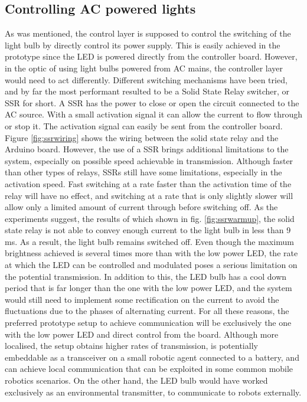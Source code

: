\subsection{Controlling AC powered lights}
As was mentioned, the control layer is supposed to control the switching of the light bulb by directly control its power supply.
This is easily achieved in the prototype since the LED is powered directly from the controller board.
However, in the optic of using light bulbs powered from AC mains, the controller layer would need to act differently.
Different switching mechanisms have been tried, and by far the most performant resulted to be a Solid State Relay switcher, or SSR for short.
A SSR has the power to close or open the circuit connected to the AC source. With a small activation signal it can allow the current to flow through or stop it.
The activation signal can easily be sent from the controller board.
Figure \ref{fig:ssrwiring} shows the wiring between the solid state relay and the Arduino board.
However, the use of a SSR brings additional limitations to the system, especially on possible speed achievable in transmission.
Although faster than other types of relays, SSRs still have some limitations, especially in the activation speed. 
Fast switching at a rate faster than the activation time of the relay will have no effect, and switching at a rate that is only slightly slower will allow only a limited amount of current through before switching off.
As the experiments suggest, the results of which shown in fig. \ref{fig:ssrwarmup}, the solid state relay is not able to convey enough current to the light bulb in less than 9 ms.
As a result, the light bulb remains switched off.
Even though the maximum brightness achieved is several times more than with the low power LED, the rate at which the LED can be controlled and modulated poses a serious limitation on the potential transmission.
In addition to this, the LED bulb has a cool down period that is far longer than the one with the low power LED, and the system would still need to implement some rectification on the current to avoid the fluctuations due to the phases of alternating current.
For all these reasons, the preferred prototype setup to achieve communication will be exclusively the one with the low power LED and direct control from the board.
Although more localised, the setup obtains higher rates of transmission, is potentially embeddable as a transceiver on a small robotic agent connected to a battery, and can achieve local communication that can be exploited in some common mobile robotics scenarios.
On the other hand, the LED bulb would have worked exclusively as an environmental transmitter, to communicate to robots externally.

